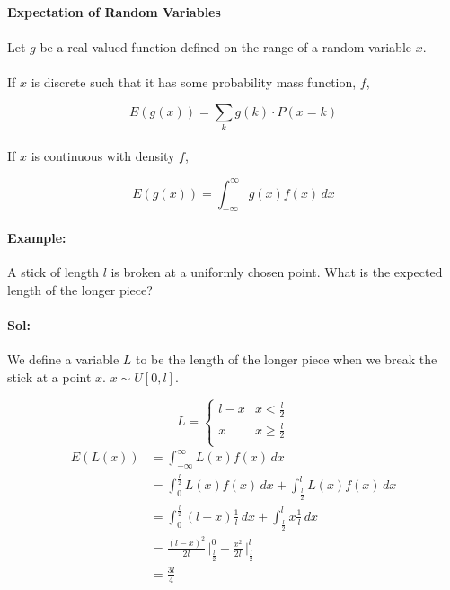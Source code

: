 \documentclass[letterpaper,12pt]{article}
\begin{document}
\paragraph{Expectation of Random Variables}
\paragraph{}Let $g$ be a real valued function defined on the range of a random variable $x$.
\paragraph{}If $x$ is discrete such that it has some probability mass function, $f$,

\[
    E(g(x)) = \sum_k g(k)\cdot P(x=k)
\]
\paragraph{}If $x$ is continuous with density $f$, 

\[
    E(g(x)) = \int_{-\infty}^{\infty}g(x)f(x)\,dx
\]

\paragraph{Example:}A stick of length $l$ is broken at a uniformly chosen point. What is the
expected length of the longer piece?

\paragraph{Sol:}We define a variable $L$ to be the length of the longer piece when we break the stick at
a point $x$. $x \sim U[0, l]$.

\[ L = \begin{cases}
    l-x & x < \frac{l}{2}\\
    x & x \ge \frac{l}{2}\\
    \end{cases}
\]
\begin{align*}
    E(L(x)) &= \int_{-\infty}^{\infty} L(x)f(x)\,dx\\
            &= \int_{0}^{\frac{l}{2}} L(x)f(x)\,dx + \int_{\frac{l}{2}}^{l}L(x)f(x)\,dx\\
            &= \int_{0}^{\frac{l}{2}} (l-x)\frac{1}{l}\,dx + \int_{\frac{l}{2}}^{l}x\frac{1}{l}\,dx\\
            &= \frac{(l-x)^2}{2l} \, \bigg|_{\frac{l}{2}}^0 + \frac{x^2}{2l}\, \bigg|_{\frac{l}{2}}^l\\
            &= \frac{3l}{4}
\end{align*}
\end{document}
